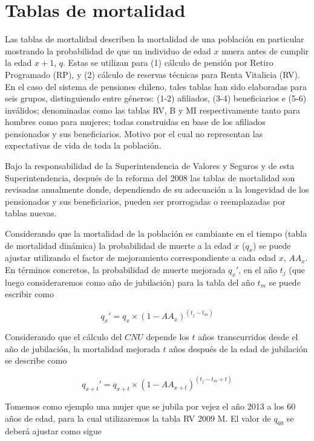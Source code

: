 \documentclass[letterpaper, 11pt]{article}
\begin{document}
\section{Tablas de mortalidad}

Las tablas de mortalidad describen la mortalidad de una poblaci\'on en particular
mostrando la probabilidad de que un individuo de edad $x$ muera antes de cumplir la edad $x+1$, $q$. 
Estas se utilizan para (1) c\'alculo de pensi\'on por Retiro Programado (RP), y (2)
c\'alculo de reservas t\'ecnicas para Renta Vitalicia (RV).
En el caso del sistema de pensiones
chileno, tales tablas han sido elaboradas para seis grupos, distinguiendo entre
g\'eneros: (1-2) afiliados, (3-4) beneficiarios e (5-6) inv\'alidos;
denominadas como las tablas RV, B y MI respectivamente tanto para hombres como para
mujeres; todas construidas en base de los afiliados pensionados y sus
beneficiarios. Motivo por el cual no representan las expectativas de vida de toda
la poblaci\'on.

Bajo la responsabilidad de la Superintendencia de Valores y Seguros 
y de esta Superintendencia, despu\'es de la reforma del 2008 las tablas de mortalidad
son revisadas anualmente donde, dependiendo de su adecuaci\'on a la longevidad
de los pensionados y sus beneficiarios, pueden ser prorrogadas o reemplazadas por tablas nuevas.

Considerando que la mortalidad de la poblaci\'on es cambiante en el tiempo (tabla
de mortalidad din\'amica) la probabilidad de muerte a la edad $x$ ($q_x$) se puede ajustar utilizando el factor
de mejoramiento correspondiente a cada edad $x$, $AA_x$. En t\'erminos concretos,
la probabilidad de muerte mejorada $q_x'$, en el a\~no $t_j$ (que luego consideraremos como a\~no
de jubilaci\'on) para la tabla del a\~no $t_m$ se puede escribir como

\begin{equation*}
q_x' = q_x \times (1 - AA_x)^{(t_j - t_m)}
\end{equation*}

Considerando que el c\'alculo del $CNU$ depende los $t$ a\~nos transcurridos desde el
a\~no de jubilaci\'on, la mortalidad mejorada $t$ a\~nos despu\'es de la edad
de jubilaci\'on se describe como

\begin{equation}\label{eq:mejoramiento}
q_{x+t}' = q_{x+t} \times (1 - AA_{x+t})^{(t_j - t_m + t)}
\end{equation}

Tomemos como ejemplo una mujer que se
jubila por vejez el a\~no 2013 a los 60 a\~nos de edad, para la cual utilizaremos la tabla
RV 2009 M. El valor de $q_{60}$ se deber\'a ajustar como sigue
\end{document}
